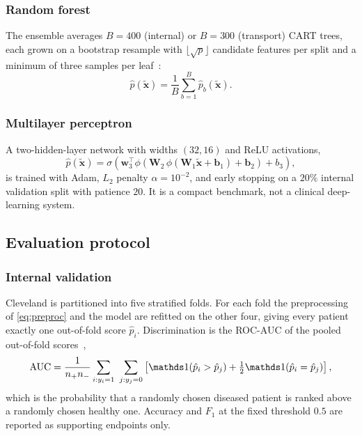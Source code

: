 \documentclass[manuscript,nonacm]{acmart}
\begin{document}
\subsubsection{Random forest}
The ensemble averages $B=400$ (internal) or $B=300$ (transport) CART trees, each grown
on a bootstrap resample with $\lfloor\sqrt{p}\rfloor$ candidate features per split and a
minimum of three samples per leaf~\cite{breiman2001}:
\begin{equation}
\hat{p}(\tilde{\mathbf{x}})=\frac{1}{B}\sum_{b=1}^{B}\hat{p}_b(\tilde{\mathbf{x}}).
\end{equation}

\subsubsection{Multilayer perceptron}
A two-hidden-layer network with widths $(32,16)$ and ReLU activations,
\begin{equation}
\hat{p}(\tilde{\mathbf{x}})=\sigma\!\left(\mathbf{w}_3^{\!\top}
   \phi\!\left(\mathbf{W}_2\,\phi(\mathbf{W}_1\tilde{\mathbf{x}}+\mathbf{b}_1)+\mathbf{b}_2\right)+b_3\right),
\end{equation}
is trained with Adam, $L_2$ penalty $\alpha=10^{-2}$, and early stopping on a $20\%$
internal validation split with patience $20$. It is a compact benchmark, not a clinical
deep-learning system.

\subsection{Evaluation protocol}
\subsubsection{Internal validation}
Cleveland is partitioned into five stratified folds. For each fold the preprocessing of
\cref{eq:preproc} and the model are refitted on the other four, giving every patient
exactly one out-of-fold score $\hat{p}_i$. Discrimination is the ROC-AUC of the pooled
out-of-fold scores~\cite{hanley1982,fawcett2006},
\begin{equation}
\mathrm{AUC}=\frac{1}{n_+n_-}\sum_{i:y_i=1}\ \sum_{j:y_j=0}
   \left[\ind(\hat p_i>\hat p_j)+\tfrac{1}{2}\ind(\hat p_i=\hat p_j)\right],
\label{eq:auc}
\end{equation}
which is the probability that a randomly chosen diseased patient is ranked above a
randomly chosen healthy one. Accuracy and $F_1$ at the fixed threshold $0.5$ are
reported as supporting endpoints only.
\end{document}
